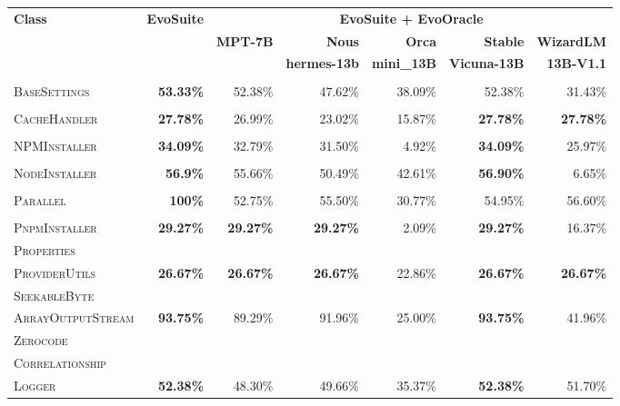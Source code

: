 \begin{table}[H]
\centering

\begin{tabular}{| l | r | r | r | r | r | r |}
\hline
\multirow{2}{*}{\textbf{Class}} & \multirow{2}{*}{\textbf{EvoSuite}} & \multicolumn{5}{c|}{\textbf{EvoSuite + EvoOracle}} \\ %
\cline{3-7} %
 &  & \textbf{MPT-7B} & \textbf{Nous} & \textbf{Orca} & \textbf{Stable} & \textbf{WizardLM} \\
 &  &  & \textbf{hermes-13b} & \textbf{mini\_13B} & \textbf{Vicuna-13B} & \textbf{13B-V1.1} \\
\hline
\scriptsize\textsc{} &  &  &  &  &  &  \\
\scriptsize\textsc{BaseSettings} & \textbf{53.33\%} & 52.38\% & 47.62\% & 38.09\% & 52.38\% & 31.43\% \\
\hline
\scriptsize\textsc{} &  &  &  &  &  &  \\
\scriptsize\textsc{CacheHandler} & \textbf{27.78\%} & 26.99\% & 23.02\% & 15.87\% & \textbf{27.78\%} & \textbf{27.78\%}  \\
\hline
\scriptsize\textsc{} &  &  &  &  &  &  \\
\scriptsize\textsc{NPMInstaller} & \textbf{34.09\%} & 32.79\% & 31.50\% & 4.92\% & \textbf{34.09\%} & 25.97\%  \\
\hline
\scriptsize\textsc{} &  &  &  &  &  &  \\
\scriptsize\textsc{NodeInstaller} & \textbf{56.9\%} & 55.66\% & 50.49\% & 42.61\% & \textbf{56.90\%} & 6.65\%  \\
\hline
\scriptsize\textsc{} &  &  &  &  &  &  \\
\scriptsize\textsc{Parallel} & \textbf{100\%} & 52.75\% & 55.50\% & 30.77\% & 54.95\% & 56.60\%  \\
\hline
\scriptsize\textsc{} &  &  &  &  &  &  \\
\scriptsize\textsc{PnpmInstaller} & \textbf{29.27\%} & \textbf{29.27\%} & \textbf{29.27\%} & 2.09\% & \textbf{29.27\%} & 16.37\%  \\
\hline
\scriptsize\textsc{Properties} &  &  &  &  &  &  \\
\scriptsize\textsc{ProviderUtils} & \textbf{26.67\%} & \textbf{26.67\%} & \textbf{26.67\%} & 22.86\% & \textbf{26.67\%} & \textbf{26.67\%}  \\
\hline
\scriptsize\textsc{SeekableByte} &  &  &  &  &  &  \\
\scriptsize\textsc{ArrayOutputStream} & \textbf{93.75\%} & 89.29\% & 91.96\% & 25.00\% & \textbf{93.75\%} & 41.96\%  \\
\hline
\scriptsize\textsc{Zerocode} &  &  &  &  &  &  \\
\scriptsize\textsc{Correlationship} &  &  &  &  &  &  \\
\scriptsize\textsc{Logger} & \textbf{52.38\%} & 48.30\% & 49.66\% & 35.37\% & \textbf{52.38\%} & 51.70\%  \\
\hline


\end{tabular}
\end{table}
